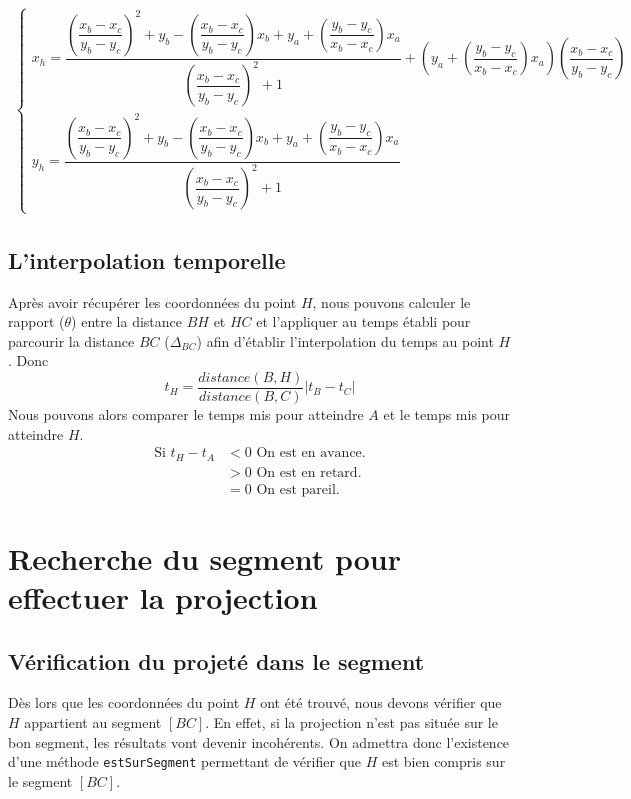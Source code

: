 \begin{align}
	\begin{cases}
		 x_h = \dfrac{\left( \dfrac{x_b - x_c}{y_b - y_c}\right)^2 + y_b - \left( \dfrac{x_b - x_c}{y_b - y_c}\right) x_b + y_a + \left( \dfrac{y_b - y_c}{x_b - x_c}\right) x_a}{\left( \dfrac{x_b - x_c}{y_b - y_c}\right)^2 + 1} + \left( y_a + \left( \dfrac{y_b - y_c}{x_b - x_c}\right) x_a\right) \left( \dfrac{x_b - x_c}{y_b - y_c}\right)  \\
    	 y_h = \dfrac{\left( \dfrac{x_b - x_c}{y_b - y_c}\right)^2 + y_b - \left( \dfrac{x_b - x_c}{y_b - y_c}\right) x_b + y_a + \left( \dfrac{y_b - y_c}{x_b - x_c}\right) x_a}{\left( \dfrac{x_b - x_c}{y_b - y_c}\right)^2 + 1}
	\end{cases}
\end{align}

\subsection{L'interpolation temporelle}
Après avoir récupérer les coordonnées du point $H$, nous pouvons calculer le rapport ($\theta$) entre la distance $BH$ et $HC$ et l'appliquer au temps établi pour parcourir la distance $BC$ ($\Delta_{BC}$) afin d'établir l'interpolation du temps au point $H$. Donc
\[
	t_H = \frac{distance(B,H)}{distance(B,C)}| t_B - t_C | 
\]
Nous pouvons alors comparer le temps mis pour atteindre $A$ et le temps mis pour atteindre $H$.
\begin{align}
\mbox{Si } t_H - t_A &<0 \mbox{ On est en avance.} \\
			&>0 \mbox{ On est en retard.} \\
			&=0 \mbox{ On est pareil.}
\end{align}

\section{Recherche du segment pour effectuer la projection}
\subsection{Vérification du projeté dans le segment}
Dès lors que les coordonnées du point $H$ ont été trouvé, nous devons vérifier que $H$ appartient au segment $[BC]$. En effet, si la projection n'est pas située sur le bon segment, les résultats vont devenir incohérents. On admettra donc l'existence d'une méthode \verb!estSurSegment! permettant de vérifier que $H$ est bien compris sur le segment $[BC]$.

